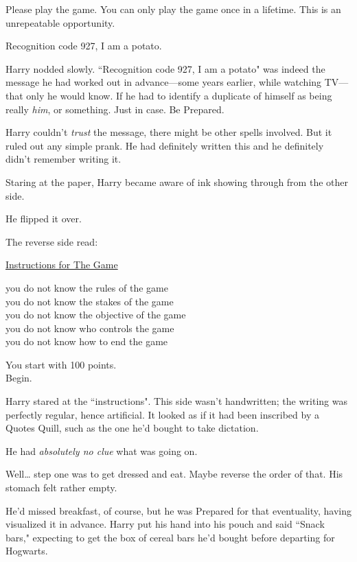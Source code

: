 \begin{writtenNote}

Please play the game. You can only play the game once in a lifetime. This is an unrepeatable opportunity.

Recognition code 927, I am a potato.

\end{writtenNote}

Harry nodded slowly. ``Recognition code 927, I am a potato" was indeed the message he had worked out in advance—some years earlier, while watching TV—that only he would know. If he had to identify a duplicate of himself as being really \emph{him}, or something. Just in case. Be Prepared.

Harry couldn't \emph{trust} the message, there might be other spells involved. But it ruled out any simple prank. He had definitely written this and he definitely didn't remember writing it.

Staring at the paper, Harry became aware of ink showing through from the other side.

He flipped it over.

The reverse side read:

\begin{writtenNote}
\underline{Instructions for The Game}

you do not know the rules of the game\\
you do not know the stakes of the game\\
you do not know the objective of the game\\
you do not know who controls the game\\
you do not know how to end the game

You start with 100 points.\\
Begin.
\end{writtenNote}

Harry stared at the ``instructions". This side wasn't handwritten; the writing was perfectly regular, hence artificial. It looked as if it had been inscribed by a Quotes Quill, such as the one he'd bought to take dictation.

He had \emph{absolutely no clue} what was going on.

Well{\ldots} step one was to get dressed and eat. Maybe reverse the order of that. His stomach felt rather empty.

He'd missed breakfast, of course, but he was Prepared for that eventuality, having visualized it in advance. Harry put his hand into his pouch and said ``Snack bars," expecting to get the box of cereal bars he'd bought before departing for Hogwarts.

